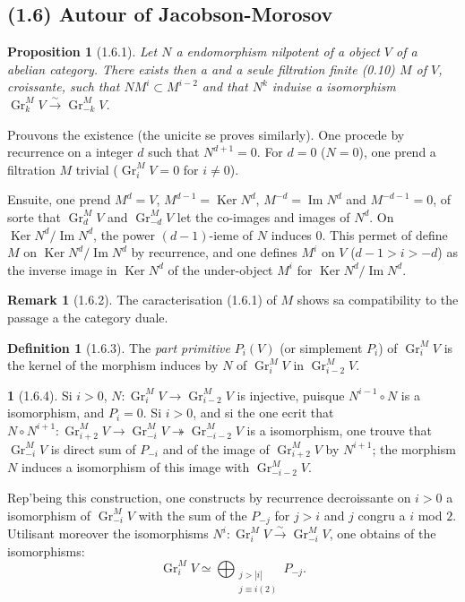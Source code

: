 \documentclass[12pt,a4paper]{article}
\theoremstyle{plain}
\newtheorem{proposition}[theorem]{Proposition}
\theoremstyle{definition}
\newtheorem{definition}[theorem]{Definition}
\newtheorem{remark}[theorem]{Remark}
\theoremstyle{definition}
\newtheorem{para}{}[section]
\theoremstyle{remark}
\DeclareMathOperator{\Gr}{Gr}
\DeclareMathOperator{\Imm}{Im}
\DeclareMathOperator{\Ker}{Ker}
\begin{document}
\newpage

\subsection*{(1.6) Autour of Jacobson-Morosov}

\begin{proposition}[1.6.1]
Let $N$ a endomorphism nilpotent of a object $V$ of a abelian category. There exists then a and a seule filtration finite (0.10) $M$ of $V$, croissante, such that $NM^i \subset M^{i-2}$ and that $N^k$ induise a isomorphism $\Gr_k^M V \xrightarrow{\sim} \Gr_{-k}^M V$.
\end{proposition}

Prouvons the existence (the unicite se proves similarly). One procede by recurrence on a integer $d$ such that $N^{d+1} = 0$. For $d = 0$ ($N = 0$), one prend a filtration $M$ trivial ($\Gr_i^M V = 0$ for $i \neq 0$).

Ensuite, one prend $M^d = V$, $M^{d-1} = \Ker N^d$, $M^{-d} = \Imm N^d$ and $M^{-d-1} = 0$, of sorte that $\Gr_d^M V$ and $\Gr_{-d}^M V$ let the co-images and images of $N^d$. On $\Ker N^d / \Imm N^d$, the power $(d-1)$-ieme of $N$ induces $0$. This permet of define $M$ on $\Ker N^d / \Imm N^d$ by recurrence, and one defines $M^i$ on $V$ ($d-1 > i > -d$) as the inverse image in $\Ker N^d$ of the under-object $M^i$ for $\Ker N^d / \Imm N^d$.

\begin{remark}[1.6.2]
The caracterisation (1.6.1) of $M$ shows sa compatibility to the passage a the category duale.
\end{remark}

\begin{definition}[1.6.3]
The \emph{part primitive} $P_i(V)$ (or simplement $P_i$) of $\Gr_i^M V$ is the kernel of the morphism induces by $N$ of $\Gr_i^M V$ in $\Gr_{i-2}^M V$.
\end{definition}

\begin{para}[1.6.4]
Si $i > 0$, $N: \Gr_i^M V \to \Gr_{i-2}^M V$ is injective, puisque $N^{i-1} \circ N$ is a isomorphism, and $P_i = 0$. Si $i > 0$, and si the one ecrit that $N \circ N^{i+1}: \Gr_{i+2}^M V \to \Gr_{-i}^M V \twoheadrightarrow \Gr_{-i-2}^M V$ is a isomorphism, one trouve that $\Gr_{-i}^M V$ is direct sum of $P_{-i}$ and of the image of $\Gr_{i+2}^M V$ by $N^{i+1}$; the morphism $N$ induces a isomorphism of this image with $\Gr_{-i-2}^M V$.

Rep'being this construction, one constructs by recurrence decroissante on $i > 0$ a isomorphism of $\Gr_{-i}^M V$ with the sum of the $P_{-j}$ for $j > i$ and $j$ congru a $i$ mod $2$. Utilisant moreover the isomorphisms $N^i: \Gr_i^M V \xrightarrow{\sim} \Gr_{-i}^M V$, one obtains of the isomorphisms:
\begin{equation}\tag{1.6.4.1}
\Gr_i^M V \simeq \bigoplus_{\substack{j > |i| \\ j \equiv i (2)}} P_{-j}.
\end{equation}
\end{para}
\end{document}
